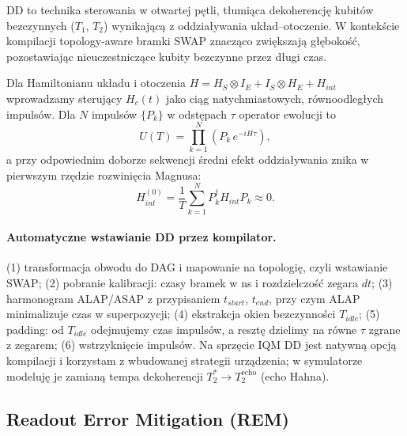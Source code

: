 \documentclass[11pt,a4paper]{article}
\begin{document}
DD to technika sterowania w otwartej pętli, tłumiąca dekoherencję kubitów bezczynnych
($T_1$, $T_2$) wynikającą z oddziaływania układ--otoczenie. W kontekście kompilacji
topology-aware bramki SWAP znacząco zwiększają głębokość, pozostawiając nieuczestniczące
kubity bezczynne przez długi czas.

Dla Hamiltonianu układu i otoczenia $H = H_S\otimes I_E + I_S\otimes H_E + H_{int}$
wprowadzamy sterujący $H_c(t)$ jako ciąg natychmiastowych, równoodległych impulsów. Dla $N$
impulsów $\{P_k\}$ w odstępach $\tau$ operator ewolucji to
\begin{equation}
U(T) = \prod_{k=1}^{N}\left(P_k\, e^{-iH\tau}\right),
\end{equation}
a przy odpowiednim doborze sekwencji średni efekt oddziaływania znika w pierwszym rzędzie
rozwinięcia Magnusa:
\begin{equation}
H^{(0)}_{int} = \frac{1}{T}\sum_{k=1}^{N} P_k^{\dagger} H_{int} P_k \approx 0.
\end{equation}

\paragraph{Automatyczne wstawianie DD przez kompilator.}
(1) transformacja obwodu do DAG i mapowanie na topologię, czyli wstawianie SWAP;
(2) pobranie kalibracji: czasy bramek w ns i rozdzielczość zegara $dt$;
(3) harmonogram ALAP/ASAP z przypisaniem $t_{start}$, $t_{end}$, przy czym ALAP minimalizuje
czas w superpozycji;
(4) ekstrakcja okien bezczynności $T_{idle}$;
(5) padding: od $T_{idle}$ odejmujemy czas impulsów, a resztę dzielimy na równe $\tau$ zgrane
z zegarem;
(6) wstrzyknięcie impulsów.
Na sprzęcie IQM DD jest natywną opcją kompilacji i korzystam z wbudowanej strategii
urządzenia; w symulatorze modeluję je zamianą tempa dekoherencji
$T_2^{*} \rightarrow T_2^{\text{echo}}$ (echo Hahna).

\subsection{Readout Error Mitigation (REM)}
\end{document}
